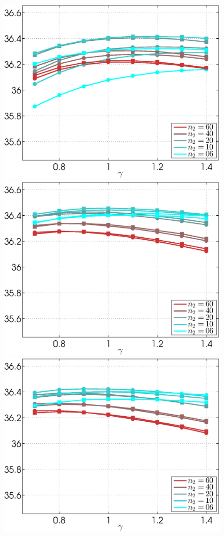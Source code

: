 \documentclass{ipol}
\begin{document}
\begin{figure}[ht!]
	\centering
	\includegraphics[width=.33\textwidth]{f/nldct/STB1WIE2-vs-WIn1WIE2_fpsnr_np2-g-curves_1np010_s10_average.eps}%
	\includegraphics[width=.33\textwidth]{f/nldct/STB1WIE2-vs-WIn1WIE2_fpsnr_np2-g-curves_1np040_s10_average.eps}%
	\includegraphics[width=.33\textwidth]{f/nldct/STB1WIE2-vs-WIn1WIE2_fpsnr_np2-g-curves_1np100_s10_average.eps}\\


\end{figure}
\end{document}

